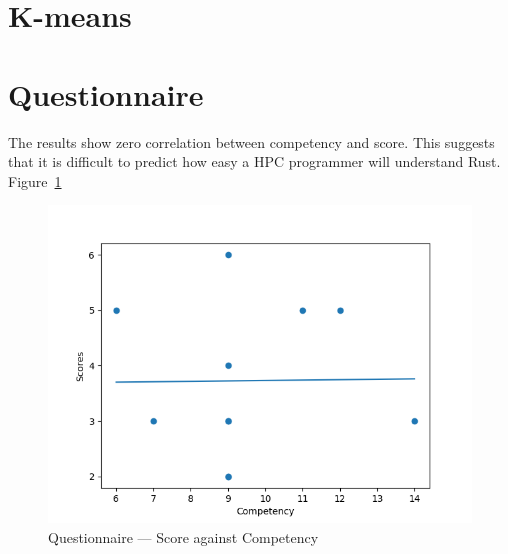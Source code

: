 \section{K-means}
\section{Questionnaire}
The results show zero correlation between competency and score. This suggests that it is difficult to predict how easy a HPC programmer will understand Rust. Figure~\ref{fig:questions}

\begin{figure}[h]
\centering
\includegraphics[width=.8\linewidth]{figs/questions/scatter.png}
\caption{Questionnaire --- Score against Competency}\label{fig:questions}
\end{figure}
